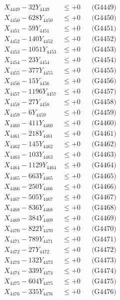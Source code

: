\documentclass[a4paper,10pt]{article}
\begin{document}
{\begin{align}
X_{4449} - 32Y_{4449} &\leq +0 && \text{(G4449)} \\
X_{4450} - 628Y_{4450} &\leq +0 && \text{(G4450)} \\
\allowbreak
X_{4451} - 59Y_{4451} &\leq +0 && \text{(G4451)} \\
X_{4452} - 140Y_{4452} &\leq +0 && \text{(G4452)} \\
X_{4453} - 1051Y_{4453} &\leq +0 && \text{(G4453)} \\
X_{4454} - 23Y_{4454} &\leq +0 && \text{(G4454)} \\
X_{4455} - 377Y_{4455} &\leq +0 && \text{(G4455)} \\
X_{4456} - 15Y_{4456} &\leq +0 && \text{(G4456)} \\
X_{4457} - 1196Y_{4457} &\leq +0 && \text{(G4457)} \\
X_{4458} - 27Y_{4458} &\leq +0 && \text{(G4458)} \\
X_{4459} - 6Y_{4459} &\leq +0 && \text{(G4459)} \\
X_{4460} - 411Y_{4460} &\leq +0 && \text{(G4460)} \\
\allowbreak
X_{4461} - 218Y_{4461} &\leq +0 && \text{(G4461)} \\
X_{4462} - 145Y_{4462} &\leq +0 && \text{(G4462)} \\
X_{4463} - 103Y_{4463} &\leq +0 && \text{(G4463)} \\
X_{4464} - 1129Y_{4464} &\leq +0 && \text{(G4464)} \\
X_{4465} - 663Y_{4465} &\leq +0 && \text{(G4465)} \\
X_{4466} - 250Y_{4466} &\leq +0 && \text{(G4466)} \\
X_{4467} - 505Y_{4467} &\leq +0 && \text{(G4467)} \\
X_{4468} - 836Y_{4468} &\leq +0 && \text{(G4468)} \\
X_{4469} - 384Y_{4469} &\leq +0 && \text{(G4469)} \\
X_{4470} - 822Y_{4470} &\leq +0 && \text{(G4470)} \\
\allowbreak
X_{4471} - 789Y_{4471} &\leq +0 && \text{(G4471)} \\
X_{4472} - 27Y_{4472} &\leq +0 && \text{(G4472)} \\
X_{4473} - 132Y_{4473} &\leq +0 && \text{(G4473)} \\
X_{4474} - 339Y_{4474} &\leq +0 && \text{(G4474)} \\
X_{4475} - 604Y_{4475} &\leq +0 && \text{(G4475)} \\
X_{4476} - 335Y_{4476} &\leq +0 && \text{(G4476)} \\

\end{align}}
\end{document}

